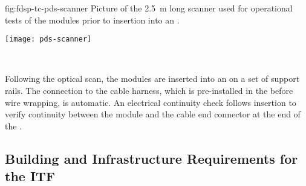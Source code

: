 \begin{dunefigure}{fig:fdsp-tc-pds-scanner}
{Picture of the \SI{2.5}{m} long scanner used for operational tests of the   modules prior to insertion into an .} 

\texttt{[image: pds-scanner]}
\end{dunefigure}
\


Following the optical scan, the  modules are inserted into an   on a set of   support rails. The connection to the cable harness, which is pre-installed in the  before wire wrapping, is automatic. An electrical continuity check follows insertion to verify  continuity between the  module and the  cable end connector at the end of the .

\subsection{Building and Infrastructure Requirements for the ITF}

